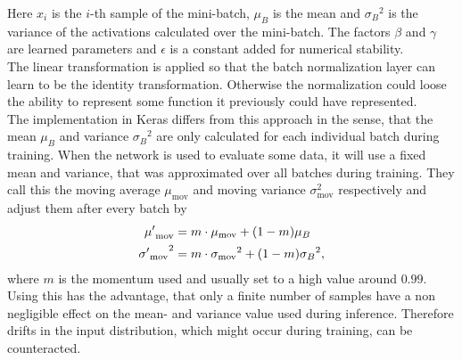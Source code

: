 Here $x_i$ is the $i$-th sample of the mini-batch, $\mu_B$ is the mean and ${\sigma_B}^2$ is the variance of the activations calculated over the mini-batch. The factors $\beta$ and $\gamma$ are learned parameters and $\epsilon$ is a constant added for numerical stability.\\
The linear transformation is applied so that the batch normalization layer can learn to be the identity transformation. Otherwise the normalization could loose the ability to represent some function it previously could have represented.\medskip\\
The implementation in Keras differs from this approach in the sense, that the mean $\mu_B$ and variance ${\sigma_B}^2$ are only calculated for each individual batch during training. When the network is used to evaluate some data, it will use a fixed mean and variance, that was approximated over all batches during training. They call this the moving average $\mu_\text{mov}$ and moving variance $\sigma_\text{mov}^2$ respectively and adjust them after every batch by
\begin{align}
{\mu'}_\text{mov} & = m\cdot\mu_\text{mov} + {\left( 1-m \right)}\mu_B\nonumber\\
{{\sigma'}_\text{mov}}^2 & = m\cdot{\sigma_\text{mov}}^2 + {\left( 1-m \right)}{\sigma_B}^2,
\end{align}
where $m$ is the momentum used and usually set to a high value around $0.99$. Using this has the advantage, that only a finite number of samples have a non negligible effect on the mean- and variance value used during inference. Therefore drifts in the input distribution, which might occur during training, can be counteracted.

